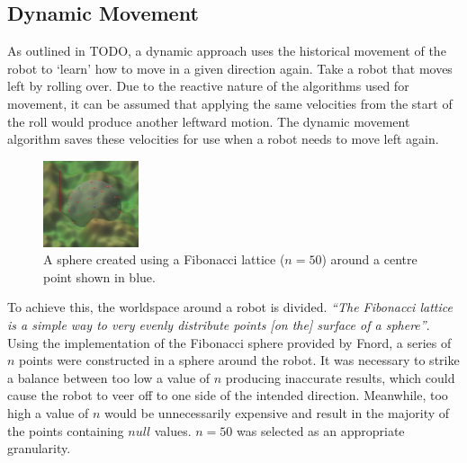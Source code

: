 \documentclass{article}
\begin{document}
\subsection{Dynamic Movement}
As outlined in TODO, a dynamic approach uses the historical movement of the robot to ‘learn’ how to move in a given direction again. 
Take a robot that moves left by rolling over. Due to the reactive nature of the algorithms used for movement, it can be assumed that applying the same velocities from the start of the roll would produce another leftward motion. The dynamic movement algorithm saves these velocities for use when a robot needs to move left again. \\
\begin{figure}
    \centering
    \vspace*{-5mm}
    \includegraphics[width=0.25\textwidth]{spherePoints}
    \vspace*{-7mm}
    \caption{A sphere created using a Fibonacci lattice ($n=50$) around a centre point shown in blue.}
\end{figure}
To achieve this, the worldspace around a robot is divided. \textit{“The Fibonacci lattice is a simple way to very evenly distribute points [on the] surface of a sphere”}.  Using the implementation of the Fibonacci sphere provided by Fnord,  a series of $n$ points were constructed in a sphere around the robot. It was necessary to strike a balance between too low a value of $n$ producing inaccurate results, which could cause the robot to veer off to one side of the intended direction. Meanwhile, too high a value of $n$ would be unnecessarily expensive and result in the majority of the points containing $null$ values. $n=50$ was selected as an appropriate granularity.\\
\end{document}

